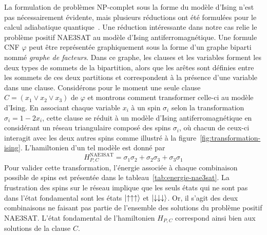 La formulation de problèmes \textsf{NP}-complet sous la forme du modèle d'Ising n'est pas nécessairement évidente, mais plusieurs réductions ont été formulées pour le calcul adiabatique quantique~\cite{lucasIsingFormulationsMany2014,lodewijksMappingNPhardNPcomplete2020}. Une réduction intéressante dans notre cas relie le problème positif NAE3SAT au modèle d'Ising antiferromagnétique. Une formule CNF $\varphi$ peut être représentée graphiquement sous la forme d'un graphe biparti nommé \textit{graphe de facteurs}. Dans ce graphe, les clauses et les variables forment les deux types de sommets de la bipartition, alors que les arêtes sont définies entre les sommets de ces deux partitions et correspondent à la présence d'une variable dans une clause. Considérons pour le moment une seule clause $C = (x_{1} \lor x_{2} \lor x_{3})$ de $\varphi$ et montrons comment transformer celle-ci au modèle d'Ising. En associant chaque variable $x_{i}$ à un spin $\sigma_{i}$ selon la transformation $\sigma_{i} = 1 - 2x_{i}$, cette clause se réduit à un modèle d'Ising antiferromagnétique en considérant un réseau triangulaire composé des spins $\sigma_{i}$, où chacun de ceux-ci interagit avec les deux autres spins comme illustré à la figure~\ref{fig:transformation-ising}. L'hamiltonien d'un tel modèle est donné par
\begin{equation}
    H_{P, C}^{\text{NAE3SAT}} = \sigma_{1}\sigma_{2} + \sigma_{2}\sigma_{3} + \sigma_{3}\sigma_{1}
\end{equation}
Pour valider cette transformation, l'énergie associée à chaque combinaison possible de spins est présentée dans le tableau~\ref{tab:energie-nae3sat}. La frustration des spins sur le réseau implique que les seuls états qui ne sont pas dans l'état fondamental sont les états $\ket{\uparrow \uparrow \uparrow}$ et $\ket{\downarrow \downarrow \downarrow}$. Or, il s'agit des deux combinaisons ne faisant pas partie de l'ensemble des solutions du problème positif NAE3SAT. L'état fondamental de l'hamiltonien $H_{P, C}$ correspond ainsi bien aux solutions de la clause $C$.

